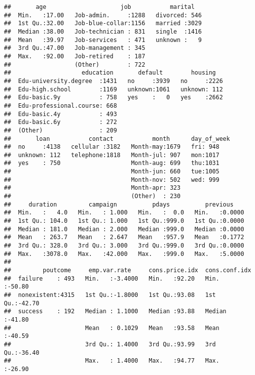 \documentclass[]{article}
\begin{document}
\begin{verbatim}
##       age                     job           marital    
##  Min.   :17.00   Job-admin.     :1288   divorced: 546  
##  1st Qu.:32.00   Job-blue-collar:1156   married :3029  
##  Median :38.00   Job-technician : 831   single  :1416  
##  Mean   :39.97   Job-services   : 471   unknown :   9  
##  3rd Qu.:47.00   Job-management : 345                  
##  Max.   :92.00   Job-retired    : 187                  
##                  (Other)        : 722                  
##                    education       default        housing    
##  Edu-university.degree  :1431   no     :3939   no     :2226  
##  Edu-high.school        :1169   unknown:1061   unknown: 112  
##  Edu-basic.9y           : 758   yes    :   0   yes    :2662  
##  Edu-professional.course: 668                                
##  Edu-basic.4y           : 493                                
##  Edu-basic.6y           : 272                                
##  (Other)                : 209                                
##       loan           contact           month      day_of_week
##  no     :4138   cellular :3182   Month-may:1679   fri: 948   
##  unknown: 112   telephone:1818   Month-jul: 907   mon:1017   
##  yes    : 750                    Month-aug: 699   thu:1031   
##                                  Month-jun: 660   tue:1005   
##                                  Month-nov: 502   wed: 999   
##                                  Month-apr: 323              
##                                  (Other)  : 230              
##     duration         campaign          pdays          previous     
##  Min.   :   4.0   Min.   : 1.000   Min.   :  0.0   Min.   :0.0000  
##  1st Qu.: 104.0   1st Qu.: 1.000   1st Qu.:999.0   1st Qu.:0.0000  
##  Median : 181.0   Median : 2.000   Median :999.0   Median :0.0000  
##  Mean   : 263.7   Mean   : 2.647   Mean   :957.9   Mean   :0.1772  
##  3rd Qu.: 328.0   3rd Qu.: 3.000   3rd Qu.:999.0   3rd Qu.:0.0000  
##  Max.   :3078.0   Max.   :42.000   Max.   :999.0   Max.   :5.0000  
##                                                                    
##         poutcome     emp.var.rate     cons.price.idx  cons.conf.idx   
##  failure    : 493   Min.   :-3.4000   Min.   :92.20   Min.   :-50.80  
##  nonexistent:4315   1st Qu.:-1.8000   1st Qu.:93.08   1st Qu.:-42.70  
##  success    : 192   Median : 1.1000   Median :93.88   Median :-41.80  
##                     Mean   : 0.1029   Mean   :93.58   Mean   :-40.59  
##                     3rd Qu.: 1.4000   3rd Qu.:93.99   3rd Qu.:-36.40  
##                     Max.   : 1.4000   Max.   :94.77   Max.   :-26.90  

\end{verbatim}
\end{document}
